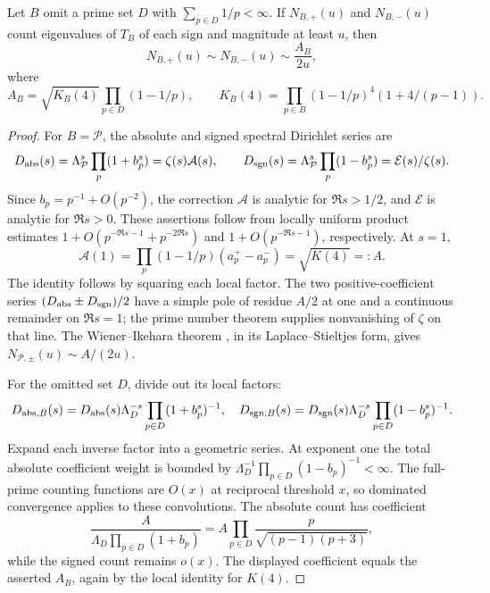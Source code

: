 \begin{lemma}\label{fin:weyl}
Let $B$ omit a prime set $D$ with $\sum_{p\in D}1/p<\infty$.
If $N_{B,+}(u)$ and $N_{B,-}(u)$ count eigenvalues of $T_B$ of each
sign and magnitude at least $u$, then
\[
 N_{B,+}(u)\sim N_{B,-}(u)\sim\frac{A_B}{2u},
\]
where
\[
 A_B=\sqrt{K_B(4)}\prod_{p\in D}(1-1/p),\qquad
 K_B(4)=\prod_{p\in B}(1-1/p)^4(1+4/(p-1)).
\]
\end{lemma}
\begin{proof}
For $B=\mathcal P$, the absolute and signed spectral Dirichlet series are
\[
 D_{\rm abs}(s)=\Lambda_{\mathcal P}^s\prod_p(1+b_p^s)
              =\zeta(s)\mathcal A(s),\qquad
 D_{\rm sgn}(s)=\Lambda_{\mathcal P}^s\prod_p(1-b_p^s)
              =\mathcal E(s)/\zeta(s).
\]
Since $b_p=p^{-1}+O(p^{-2})$, the correction $\mathcal A$ is analytic
for $\Re s>1/2$, and $\mathcal E$ is analytic for $\Re s>0$.
These assertions follow from locally uniform product estimates
$1+O(p^{-\Re s-1}+p^{-2\Re s})$ and
$1+O(p^{-\Re s-1})$, respectively.
At $s=1$,
\[
 \mathcal A(1)
 =\prod_p(1-1/p)(a_p^+-a_p^-)=\sqrt{K(4)}=:A.
\]
The identity follows by squaring each local factor.
The two positive-coefficient series
$(D_{\rm abs}\pm D_{\rm sgn})/2$ have a simple pole of residue $A/2$
at one and a continuous remainder on $\Re s=1$; the prime number
theorem supplies nonvanishing of $\zeta$ on that line.
The Wiener--Ikehara theorem \cite{finIkehara}, in its
Laplace--Stieltjes form, gives
$N_{\mathcal P,\pm}(u)\sim A/(2u)$.

For the omitted set $D$, divide out its local factors:
\[
 D_{{\rm abs},B}(s)
 =D_{\rm abs}(s)\Lambda_D^{-s}
                \prod_{p\in D}(1+b_p^s)^{-1},
 \quad
 D_{{\rm sgn},B}(s)
 =D_{\rm sgn}(s)\Lambda_D^{-s}
                \prod_{p\in D}(1-b_p^s)^{-1}.
\]
Expand each inverse factor into a geometric series.  At exponent one
the total absolute coefficient weight is bounded by
$\Lambda_D^{-1}\prod_{p\in D}(1-b_p)^{-1}<\infty$.
The full-prime counting functions are $O(x)$ at reciprocal threshold
$x$, so dominated convergence applies to these convolutions.
The absolute count has coefficient
\[
 \frac{A}{\Lambda_D\prod_{p\in D}(1+b_p)}
 =A\prod_{p\in D}\frac{p}{\sqrt{(p-1)(p+3)}},
\]
while the signed count remains $o(x)$.  The displayed coefficient
equals the asserted $A_B$, again by the local identity for $K(4)$.
\end{proof}
